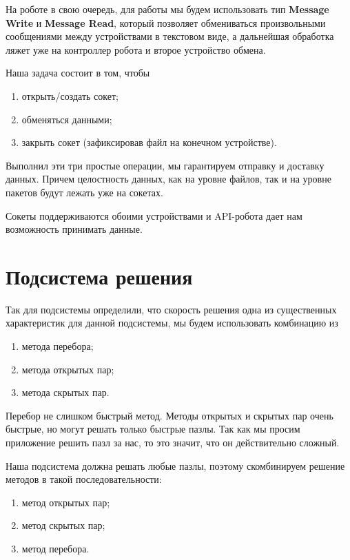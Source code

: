 На роботе в свою очередь, для работы мы будем использовать тип \textbf{Message Write} и \textbf{Message Read}, который позволяет обмениваться произвольными сообщениями между устройствами в текстовом виде, а дальнейшая обработка ляжет уже на контроллер робота и второе устройство обмена.

Наша задача состоит в том, чтобы 
\begin{enumerate}
  \item открыть/создать сокет;
  \item обменяться данными;
  \item закрыть сокет (зафиксировав файл на конечном устройстве).
\end{enumerate}

Выполнил эти три простые операции, мы гарантируем отправку и доставку данных. Причем целостность данных, как на уровне файлов, так и на уровне пакетов будут лежать уже на сокетах.

Сокеты поддерживаются обоими устройствами и API-робота дает нам возможность принимать данные.

\section{Подсистема решения}

Так для подсистемы определили, что скорость решения одна из существенных характеристик для данной подсистемы, мы будем использовать комбинацию из 

\begin{enumerate}
  \item метода перебора;
  \item метода открытых пар;
  \item метода скрытых пар.
\end{enumerate}

Перебор не слишком быстрый метод. Методы открытых  и скрытых пар очень быстрые, но могут решать только быстрые пазлы. Так как мы просим приложение решить пазл за нас, то это значит, что он действительно сложный. 

Наша подсистема должна решать любые пазлы, поэтому скомбинируем решение методов в такой последовательности:

\begin{enumerate}
  \item метод открытых пар;
  \item метод скрытых пар;
  \item метод перебора.
\end{enumerate}

